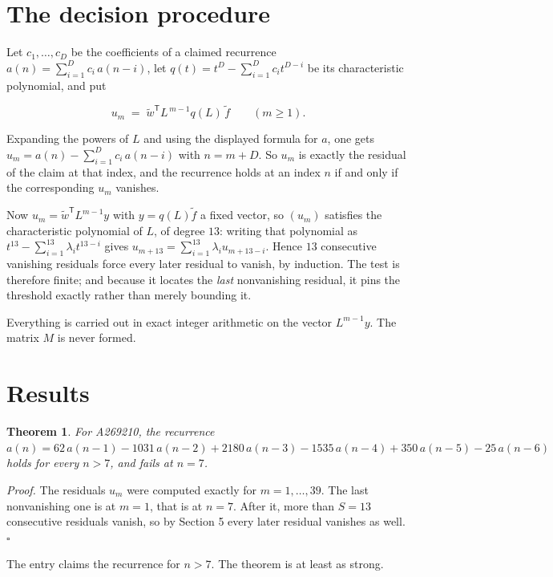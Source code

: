 \documentclass[11pt]{article}
\newtheorem{theorem}{Theorem}
\theoremstyle{definition}
\begin{document}
\section{The decision procedure}

Let $c_1,\dots,c_D$ be the coefficients of a claimed recurrence $a(n) = \sum_{i=1}^{D} c_i\,a(n-i)$, let $q(t) = t^{D} - \sum_{i=1}^{D} c_i t^{D-i}$ be its characteristic polynomial, and put

\[u_m \;=\; \tilde w^{\mathsf T} L^{\,m-1} q(L)\,\tilde f \qquad (m \ge 1).\]

Expanding the powers of $L$ and using the displayed formula for $a$, one gets $u_m = a(n) - \sum_{i=1}^{D} c_i\,a(n-i)$ with $n = m + D$. So $u_m$ is exactly the residual of the claim at that index, and the recurrence holds at an index $n$ if and only if the corresponding $u_m$ vanishes.

Now $u_m = \tilde w^{\mathsf T} L^{m-1} y$ with $y = q(L)\tilde f$ a fixed vector, so $(u_m)$ satisfies the characteristic polynomial of $L$, of degree $13$: writing that polynomial as $t^{13} - \sum_{i=1}^{13} \lambda_i t^{13-i}$ gives $u_{m+13} = \sum_{i=1}^{13} \lambda_i u_{m+13-i}$. Hence $13$ consecutive vanishing residuals force every later residual to vanish, by induction. The test is therefore finite; and because it locates the {\itshape last} nonvanishing residual, it pins the threshold exactly rather than merely bounding it.

Everything is carried out in exact integer arithmetic on the vector $L^{m-1}y$. The matrix $M$ is never formed.

\section{Results}

\begin{theorem} For A269210, the recurrence $a(n) = 62\,a(n-1) - 1031\,a(n-2) + 2180\,a(n-3) - 1535\,a(n-4) + 350\,a(n-5) - 25\,a(n-6)$ holds for every $n > 7$, and fails at $n = 7$.\end{theorem}

{\itshape Proof.} The residuals $u_m$ were computed exactly for $m = 1,\dots,39$. The last nonvanishing one is at $m = 1$, that is at $n = 7$. After it, more than $S = 13$ consecutive residuals vanish, so by Section 5 every later residual vanishes as well. $\square$

The entry claims the recurrence for $n > 7$. The theorem is at least as strong.
\end{document}
